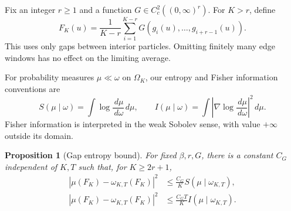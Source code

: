 \documentclass[11pt,reqno]{amsart}
\numberwithin{equation}{section}
\newtheorem{proposition}[theorem]{Proposition}
\theoremstyle{definition}
\theoremstyle{remark}
\newcommand{\1}{\mathbf 1}
\newcommand{\dd}{\,d}
\newcommand{\abs}[1]{\left\lvert #1\right\rvert}
\begin{document}
Fix an integer $r\ge1$ and a function $G\in C_c^2((0,\infty)^r)$.
For $K>r$, define
\begin{equation}\label{eq:gap-observable}
F_K(u)=\frac1{K-r}
\sum_{i=1}^{K-r}G(g_i(u),\ldots,g_{i+r-1}(u)).
\end{equation}
This uses only gaps between interior particles. Omitting finitely many
edge windows has no effect on the limiting average.

For probability measures $\mu\ll\omega$ on $\Omega_K$, our entropy and
Fisher information conventions are
\[
S(\mu\mid\omega)=\int\log\frac{\dd\mu}{\dd\omega}\dd\mu,\qquad
I(\mu\mid\omega)=
\int\abs{\nabla\log\frac{\dd\mu}{\dd\omega}}^2\dd\mu.
\]
Fisher information is interpreted in the weak Sobolev sense, with value
$+\infty$ outside its domain.

\begin{proposition}[Gap entropy bound]\label{prop:gap-entropy}
For fixed $\beta,r,G$, there is a constant $C_G$ independent of $K,T$
such that, for $K\ge2r+1$,
\begin{align}
|\mu(F_K)-\omega_{K,T}(F_K)|^2
&\le \frac{C_G}{K}S(\mu\mid\omega_{K,T}),\label{eq:entropy-gap}\\
|\mu(F_K)-\omega_{K,T}(F_K)|^2
&\le \frac{C_GT}{K}I(\mu\mid\omega_{K,T}).\label{eq:fisher-gap}
\end{align}
\end{proposition}
\end{document}
